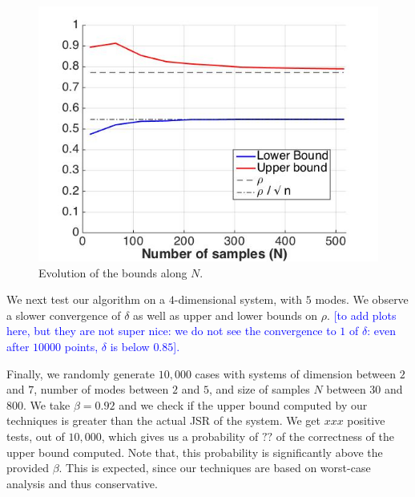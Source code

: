 \begin{figure}
\begin{center}
\includegraphics[scale=0.35]{bounds1.jpg}

\caption{Evolution of the bounds along $N$.}
\label{fig:21}
\end{center}
\end{figure}

We next test our algorithm on a $4$-dimensional system, with $5$ modes. We observe a slower convergence of $\delta$ as well as upper and lower bounds on $\rho$.
\textcolor{blue}{[to add plots here, but they are not super nice: we do not see the convergence to $1$ of $\delta$: even after $10 000$ points, $\delta$ is below $0.85$].}

Finally, we randomly generate $10,000$ cases with systems of dimension between $2$ and $7$, number of modes between $2$ and $5$, and size of samples $N$ between $30$ and $800$. We take $\beta = 0.92$ and we check if the upper bound computed by our techniques is greater than the actual JSR of the system. We get $xxx$ positive tests, out of $10,000$, which gives us a probability of $??$ of the correctness of the upper bound computed. Note that, this probability is significantly above the provided $\beta$. This is expected, since our techniques are based on worst-case analysis and thus conservative.



